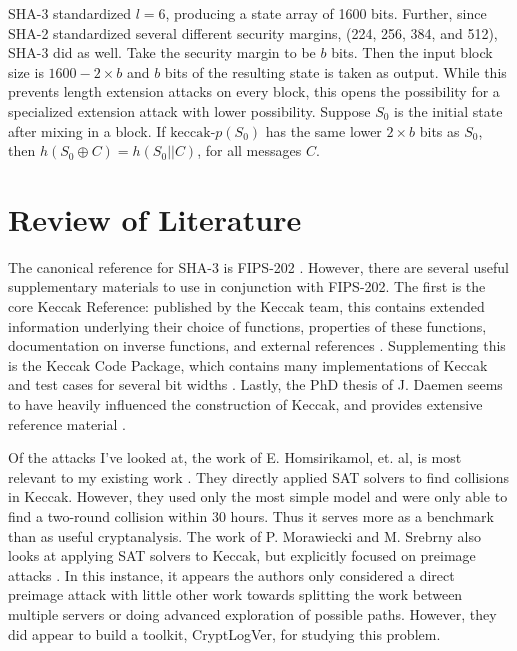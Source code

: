 \documentclass[10pt,twocolumn,twoside]{pnas-new}
\begin{document}
    SHA-3 standardized $l=6$, producing a state array of 1600 bits. Further,
since SHA-2 standardized several different security margins, (224, 256,  384,
and 512), SHA-3 did as well. Take the security margin to be $b$ bits.
Then the input block size is $1600 - 2\times b$ and $b$ bits of the resulting
state is taken as output. While this prevents length extension attacks on
every block, this opens the possibility for a specialized extension attack
with lower possibility. Suppose $S_0$ is the initial state after mixing
in a block. If $\text{keccak-}p(S_0)$ has the same lower $2 \times b$ bits
as $S_0$, then $h(S_0 \oplus C) = h(S_0 || C)$, for all messages $C$.



\section{Review of Literature}\label{sec:literature}

    The canonical reference for SHA-3 is FIPS-202 \cite{NIST202}. However,
there are several useful supplementary materials to use in conjunction with
FIPS-202. The first is the core Keccak Reference: published by the Keccak team,
this contains extended information underlying their choice of functions,
properties of these functions, documentation on inverse functions, and external
references \cite{Keccak3}. Supplementing this is the Keccak Code Package,
which contains many implementations of Keccak and test cases for several bit
widths \cite{KeccakCodePackage}. Lastly, the PhD thesis of J. Daemen seems
to have heavily influenced the construction of Keccak, and provides extensive
reference material \cite{DaemenThesis}.

    Of the attacks I've looked at, the work of E. Homsirikamol, et. al,
is most relevant to my existing work \cite{cryptoeprint:2012:421}. They
directly applied SAT solvers to find collisions in Keccak. However, they used
only the most simple model and were only able to find a two-round collision
within 30 hours. Thus it serves more as a benchmark than as useful
cryptanalysis. The work of P. Morawiecki and M. Srebrny also looks at applying
SAT solvers to Keccak, but explicitly focused on preimage attacks
\cite{cryptoeprint:2010:285}. In this instance, it appears the authors only
considered a direct preimage attack with little other work towards splitting
the work between multiple servers or doing advanced exploration of possible
paths. However, they did appear to build a toolkit, CryptLogVer, for studying
this problem.
\end{document}
